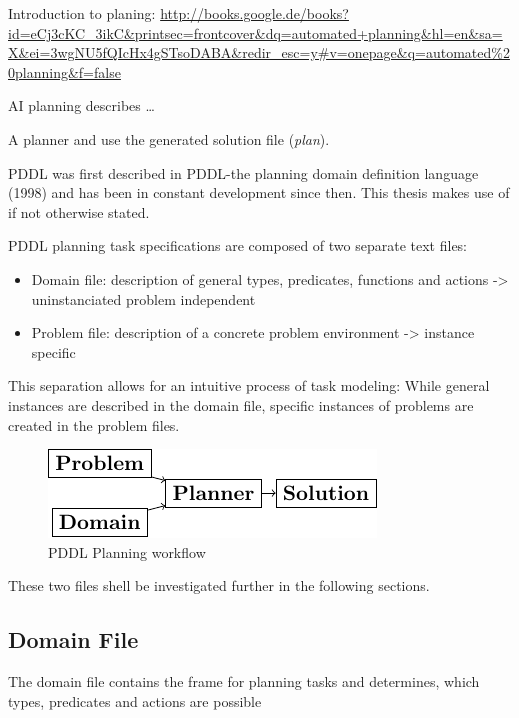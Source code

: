 \documentclass[11pt]{article}
\begin{document}
Introduction to planing:
\url{http://books.google.de/books?id=eCj3cKC_3ikC&printsec=frontcover&dq=automated+planning&hl=en&sa=X&ei=3wgNU5fQIcHx4gSTsoDABA&redir_esc=y#v=onepage&q=automated%20planning&f=false}

AI planning describes \ldots{}

A planner and use the generated solution file (\emph{plan}).

PDDL was first described in PDDL-the planning domain definition
language (1998) and has been in constant development since then.
This thesis makes use of \textcite{pddl3.1} if not otherwise stated. 

PDDL planning task specifications are composed of two separate text files:

\begin{itemize}
\item Domain file: description of general types, predicates, functions
and actions -> uninstanciated problem independent
\item Problem file: description of a concrete problem environment -> instance speciﬁc
\end{itemize}

This separation allows for an intuitive process of task modeling:
While general instances are described in the domain file, specific
instances of problems are created in the problem files.

\begin{figure}[htb]
\centering
\includegraphics[width=.9\linewidth]{../img/pddl-workflow.pdf}
\caption{\label{fig:workflow}PDDL Planning workflow}
\end{figure}

These two files shell be investigated further in the following
sections.


\subsection{Domain File}
\label{sec-3-1}

The domain file contains the frame for planning tasks and determines,
which types, predicates and actions are possible
\end{document}
